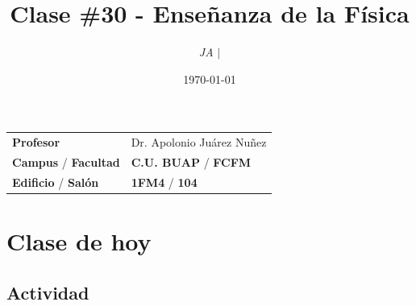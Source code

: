 \documentclass{article}
\title{Clase \#30 - Enseñanza de la Física}
\author{\emph{JA} $\boldsymbol{\mid}$}
\date{\today}
\begin{document}
\maketitle



\begin{mybox}
  \noindent\begin{tabular}{@{}ll}
    {\bfseries{Profesor}} & Dr. Apolonio Juárez Nuñez\\
    \textcolor{prussianblue}{\bfseries{Campus}} / \textcolor{trueblue}{\bfseries{Facultad}}  & \textcolor{prussianblue}{\bfseries{C.U. BUAP}} /  \textcolor{trueblue}{\bfseries{FCFM}} \\
    \textcolor{prussianblue}{\bfseries{Edificio}} /  \textcolor{trueblue}{\bfseries{Salón}}    &   \textcolor{prussianblue}{\bfseries{1FM4}} /  \textcolor{trueblue}{\bfseries{104}}   
  \end{tabular} 
\end{mybox} \vspace{1cm}



\vspace{2cm}
\tableofcontents  \vspace{2cm}

\section{Clase de hoy}

\subsection{Actividad}


 
\end{document}
